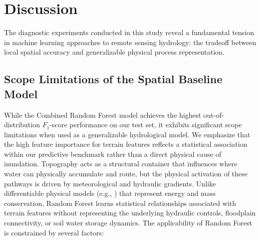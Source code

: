 \section{Discussion}
The diagnostic experiments conducted in this study reveal a fundamental tension in machine learning approaches to remote sensing hydrology: the tradeoff between local spatial accuracy and generalizable physical process representation.

\subsection{Scope Limitations of the Spatial Baseline Model}
While the Combined Random Forest model achieves the highest out-of-distribution $F_1$-score performance on our test set, it exhibits significant scope limitations when used as a generalizable hydrological model. We emphasize that the high feature importance for terrain features reflects a statistical association within our predictive benchmark rather than a direct physical cause of inundation. Topography acts as a structural container that influences where water can physically accumulate and route, but the physical activation of these pathways is driven by meteorological and hydraulic gradients. Unlike differentiable physical models (e.g., \citealp{Feng2023The}) that represent energy and mass conservation, Random Forest learns statistical relationships associated with terrain features without representing the underlying hydraulic controls, floodplain connectivity, or soil water storage dynamics. The applicability of Random Forest is constrained by several factors:
